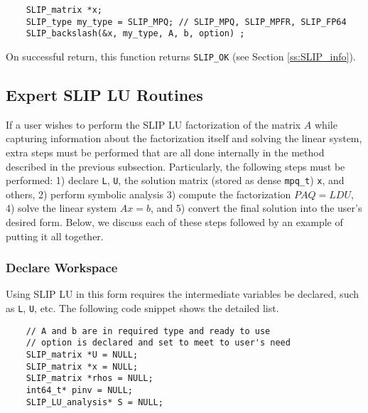 \documentclass[12pt]{article}
\theoremstyle{definition}
\begin{document}
{\small
\begin{verbatim}
    SLIP_matrix *x;
    SLIP_type my_type = SLIP_MPQ; // SLIP_MPQ, SLIP_MPFR, SLIP_FP64
    SLIP_backslash(&x, my_type, A, b, option) ;
    \end{verbatim} }

On successful return, this function returns \verb|SLIP_OK| (see Section
\ref{ss:SLIP_info}).

\cprotect\subsection{Expert SLIP LU Routines}
\label{s:Using:expert}

If a user wishes to perform the SLIP LU factorization of the matrix $A$ while
capturing information about the factorization itself and solving the linear
system, extra steps must be performed that are all done internally in the
method described in the previous subsection. Particularly, the following steps
must be performed: 1) declare \verb|L|, \verb|U|, the solution matrix
(stored as dense \verb|mpq_t|) \verb|x|, and others,
2) perform symbolic analysis 3) compute the factorization
$PAQ = L D U$, 4) solve the linear system $Ax =b$, and 5) convert the final
solution into the user's desired form. Below, we discuss each of these steps
followed by an example of putting it all together.

\subsubsection{Declare Workspace}

Using SLIP LU in this form requires the intermediate variables be declared,
such as \verb|L|, \verb|U|, etc. The following code snippet shows the
detailed list.

{\small
\begin{verbatim}
    // A and b are in required type and ready to use
    // option is declared and set to meet to user's need
    SLIP_matrix *U = NULL;
    SLIP_matrix *x = NULL;
    SLIP_matrix *rhos = NULL;
    int64_t* pinv = NULL;
    SLIP_LU_analysis* S = NULL;
     \end{verbatim} }
\end{document}
